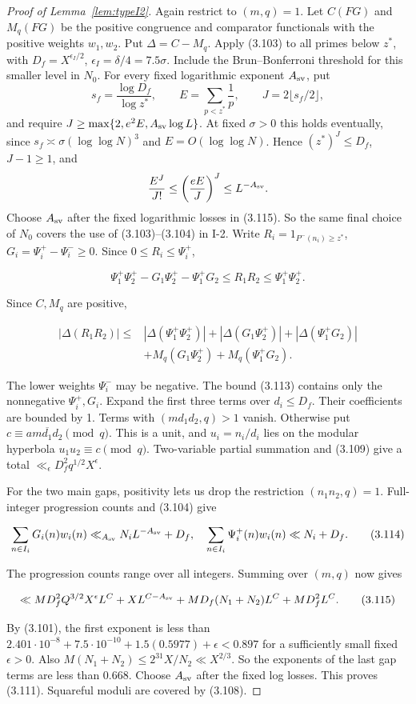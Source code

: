 \begin{proof}[Proof of Lemma~\ref{lem:typeI2}]
Again restrict to $(m,q)=1$. Let $C(FG)$ and $M_q(FG)$
be the positive congruence and comparator functionals with the
positive weights $w_1,w_2$. Put $\Delta=C-M_q$.
Apply (3.103) to all primes below $z^*$, with
$D_f=X^{\epsilon_I/2}$, $\epsilon_I=\delta/4=7.5\sigma$.
Include the Brun--Bonferroni threshold for this smaller level in $N_0$.
For every fixed logarithmic exponent $A_{\rm sv}$, put
\[
s_f=\frac{\log D_f}{\log z^*},\qquad
E=\sum_{p<z^*}\frac1p,\qquad J=2\lfloor s_f/2\rfloor,
\]
and require $J\ge\max\{2,e^2E,A_{\rm sv}\log L\}$.
At fixed $\sigma>0$ this holds eventually,
since $s_f\asymp\sigma(\log\log N)^3$ and $E=O(\log\log N)$.
Hence $(z^*)^J\le D_f$, $J-1\ge1$, and
\[
\frac{E^J}{J!}\le\left(\frac{eE}{J}\right)^J\le L^{-A_{\rm sv}}.
\]
Choose $A_{\rm sv}$ after the fixed logarithmic losses in (3.115).
So the same final choice of $N_0$ covers the use of (3.103)--(3.104) in I-2.
Write $R_i=1_{P^-(n_i)\ge z^*}$, $G_i=\Psi_i^+-\Psi_i^-\ge0$.
Since $0\le R_i\le \Psi_i^+$,

\[
\Psi_1^+\Psi_2^+-G_1\Psi_2^+-\Psi_1^+G_2\le R_1R_2\le \Psi_1^+\Psi_2^+.
\tag{3.112}
\]

Since $C,M_q$ are positive,

\[
\begin{aligned}
|\Delta(R_1R_2)|\le{}&|\Delta(\Psi_1^+\Psi_2^+)|+|\Delta(G_1\Psi_2^+)|
 +|\Delta(\Psi_1^+G_2)|\\
&+M_q(G_1\Psi_2^+)+M_q(\Psi_1^+G_2).
\end{aligned}
\tag{3.113}
\]

The lower weights $\Psi_i^-$ may be negative.
The bound (3.113) contains only the nonnegative $\Psi_i^+,G_i$.
Expand the first three terms over $d_i\le D_f$.
Their coefficients are bounded by 1. Terms with $(md_1d_2,q)>1$ vanish.
Otherwise put $c\equiv a\overline{md_1d_2}\pmod q$.
This is a unit, and $u_i=n_i/d_i$ lies on the modular hyperbola
$u_1u_2\equiv c\pmod q$.
Two-variable partial summation and (3.109) give a total
$\ll_\epsilon D_f^2q^{1/2}X^\epsilon$.

For the two main gaps, positivity lets us drop the restriction
$(n_1n_2,q)=1$. Full-integer progression counts and (3.104) give

\[
\sum_{n\in I_i}G_i(n)w_i(n)\ll_{A_{\rm sv}} N_iL^{-A_{\rm sv}}+D_f,
\quad\sum_{n\in I_i}\Psi_i^+(n)w_i(n)\ll N_i+D_f.
\tag{3.114}
\]

The progression counts range over all integers.
Summing over $(m,q)$ now gives

\[
\ll M D_f^2Q^{3/2}X^\epsilon L^C+XL^{C-A_{\rm sv}}
       +M D_f(N_1+N_2)L^C+M D_f^2L^C.
\tag{3.115}
\]

By (3.101), the first exponent is less than
$2.401\cdot10^{-8}+7.5\cdot10^{-10}+1.5(0.5977)+\epsilon<0.897$
for a sufficiently small fixed $\epsilon>0$. Also
$M(N_1+N_2)\le2^{31}X/N_2\ll X^{2/3}$.
So the exponents of the last gap terms are less than 0.668.
Choose $A_{\rm sv}$ after the fixed log losses.
This proves (3.111). Squareful moduli are covered by (3.108).
\end{proof}

